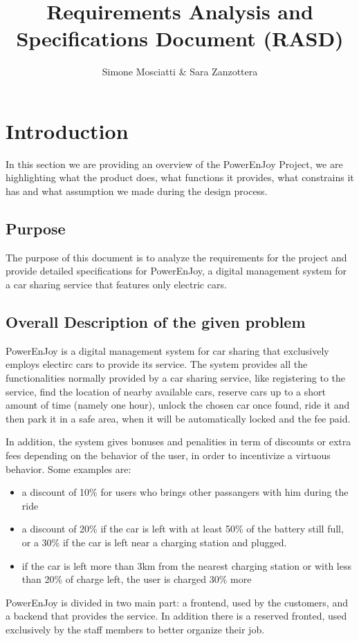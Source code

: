 \documentclass[11pt]{article} %
\title{Requirements Analysis and Specifications Document (RASD)}
\author{Simone Mosciatti \& Sara Zanzottera}
\newcommand{\pe}{PowerEnJoy }
\newcommand{\pecomma}{PowerEnJoy, }
\begin{document}
\maketitle
\newpage
\tableofcontents
\newpage


\section{Introduction}

In this section we are providing an overview of the \pe Project, we are highlighting what the product does, what functions it provides, what constrains it has and what assumption we made during the design process.

  \subsection{Purpose}
  
The purpose of this document is to analyze the requirements for the project and provide detailed specifications for \pecomma a digital management system for a car sharing service that features only electric cars. 
  

  \subsection{Overall Description of the given problem}

\pe is a digital management system for car sharing that exclusively employs electirc cars to provide its service. The system provides all the functionalities normally provided by a car sharing service, like registering to the service, find the location of nearby available cars, reserve cars up to a short amount of time (namely one hour), unlock the chosen car once found, ride it and then park it in a safe area, when it will be automatically locked and the fee paid.

In addition, the system gives bonuses and penalities in term of discounts or extra fees depending on the behavior of the user, in order to incentivize a virtuous behavior. Some examples are:
\begin{itemize}
\item a discount of 10\% for users who brings other passangers with him during the ride
\item a discount of 20\% if the car is left with at least 50\% of the battery still full, or a 30\% if the car is left near a charging station and plugged.
\item if the car is left more than 3km from the nearest charging station or with less than 20\% of charge left, the user is charged 30\% more
\end{itemize}
  \pe is divided in two main part: a frontend, used by the customers, and a backend that provides the service. In addition there is a reserved fronted, used exclusively by the staff members to better organize their job.
\end{document}
